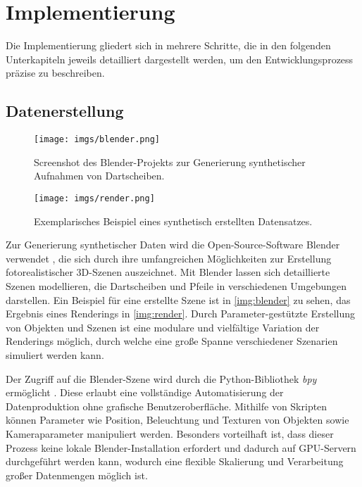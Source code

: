 \section{Implementierung}
\label{sec:implementierung}
Die Implementierung gliedert sich in mehrere Schritte, die in den folgenden Unterkapiteln jeweils detailliert dargestellt werden, um den Entwicklungsprozess präzise zu beschreiben.

\subsection{Datenerstellung}
\label{sec:implementierung:datenerstellung}

\begin{figure}
    \centering
    \texttt{[image: imgs/blender.png]}
    \caption{Screenshot des Blender-Projekts zur Generierung synthetischer Aufnahmen von Dartscheiben.}
    \label{img:blender}
\end{figure}

\begin{figure}
    \centering
    \texttt{[image: imgs/render.png]}
    \caption{Exemplarisches Beispiel eines synthetisch erstellten Datensatzes.}
    \label{img:render}
\end{figure}

Zur Generierung synthetischer Daten wird die Open-Source-Software Blender verwendet \cite{blender}, die sich durch ihre umfangreichen Möglichkeiten zur Erstellung fotorealistischer 3D-Szenen auszeichnet. Mit Blender lassen sich detaillierte Szenen modellieren, die Dartscheiben und Pfeile in verschiedenen Umgebungen darstellen. Ein Beispiel für eine erstellte Szene ist in \autoref{img:blender} zu sehen, das Ergebnis eines Renderings in \autoref{img:render}. Durch Parameter-gestützte Erstellung von Objekten und Szenen ist eine modulare und vielfältige Variation der Renderings möglich, durch welche eine große Spanne verschiedener Szenarien simuliert werden kann.

Der Zugriff auf die Blender-Szene wird durch die Python-Bibliothek \textit{bpy} ermöglicht \cite{bpy}. Diese erlaubt eine vollständige Automatisierung der Datenproduktion ohne grafische Benutzeroberfläche. Mithilfe von Skripten können Parameter wie Position, Beleuchtung und Texturen von Objekten sowie Kameraparameter manipuliert werden. Besonders vorteilhaft ist, dass dieser Prozess keine lokale Blender-Installation erfordert und dadurch auf GPU-Servern durchgeführt werden kann, wodurch eine flexible Skalierung und Verarbeitung großer Datenmengen möglich ist.

